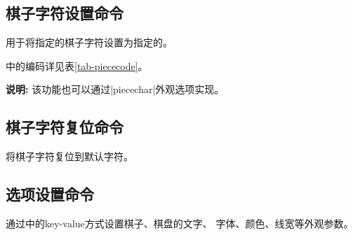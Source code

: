 \documentclass[full]{l3doc}
\begin{document}
\begin{documentation}
\begin{SideBySideExample}[frame=single,numbers=left,
                xrightmargin=.28\linewidth,gobble=2]
\end{SideBySideExample}

\subsection{棋子字符设置命令}

\begin{function}{\piecechar}
  \begin{syntax}
      
  \end{syntax}
\end{function}

  用于将指定的棋子字符设置为指定的。

  中的编码详见表\ref{tab-piececode}。

  \textbf{\textsf{说明: }}该功能也可以通过|piecechar|外观选项实现。

\subsection{棋子字符复位命令}

\begin{function}{\resetpiece}
  \begin{syntax}
  \end{syntax}
\end{function}

  将棋子字符复位到默认字符。

\subsection{选项设置命令}

\begin{function}{\cchessset}
  \begin{syntax}
     
  \end{syntax}
\end{function}

  通过中的key-value方式设置棋子、棋盘的文字、
  字体、颜色、线宽等外观参数。



\end{documentation}
\end{document}
